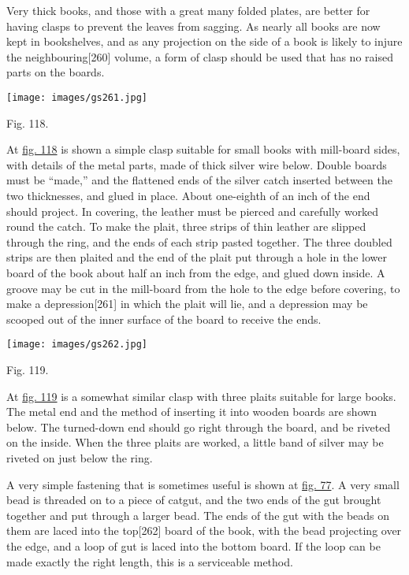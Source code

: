 \documentclass[
]{article}
\begin{document}
Very thick books, and those with a great many folded plates, are better
for having clasps to prevent the leaves from sagging. As nearly all
books are now kept in bookshelves, and as any projection on the side of
a book is likely to injure the
neighbouring{\protect\hypertarget{Page_260}{}{{[}260{]}}} volume, a form
of clasp should be used that has no raised parts on the boards.

\protect\hypertarget{Fig_118}{}{}
\texttt{[image: images/gs261.jpg]}

Fig. 118.

At \protect\hyperlink{Fig_118}{fig. 118} is shown a simple clasp
suitable for small books with mill-board sides, with details of the
metal parts, made of thick silver wire below. Double boards must be
``made,'' and the flattened ends of the silver catch inserted between
the two thicknesses, and glued in place. About one-eighth of an inch of
the end should project. In covering, the leather must be pierced and
carefully worked round the catch. To make the plait, three strips of
thin leather are slipped through the ring, and the ends of each strip
pasted together. The three doubled strips are then plaited and the end
of the plait put through a hole in the lower board of the book about
half an inch from the edge, and glued down inside. A groove may be cut
in the mill-board from the hole to the edge before covering, to make a
depression{\protect\hypertarget{Page_261}{}{{[}261{]}}} in which the
plait will lie, and a depression may be scooped out of the inner surface
of the board to receive the ends.

\protect\hypertarget{Fig_119}{}{}
\texttt{[image: images/gs262.jpg]}

Fig. 119.

At \protect\hyperlink{Fig_119}{fig. 119} is a somewhat similar clasp
with three plaits suitable for large books. The metal end and the method
of inserting it into wooden boards are shown below. The turned-down end
should go right through the board, and be riveted on the inside. When
the three plaits are worked, a little band of silver may be riveted on
just below the ring.

A very simple fastening that is sometimes useful is shown at
\protect\hyperlink{Fig_77}{fig. 77}. A very small bead is threaded on to
a piece of catgut, and the two ends of the gut brought together and put
through a larger bead. The ends of the gut with the beads on them are
laced into the top{\protect\hypertarget{Page_262}{}{{[}262{]}}} board of
the book, with the bead projecting over the edge, and a loop of gut is
laced into the bottom board. If the loop can be made exactly the right
length, this is a serviceable method.
\end{document}
